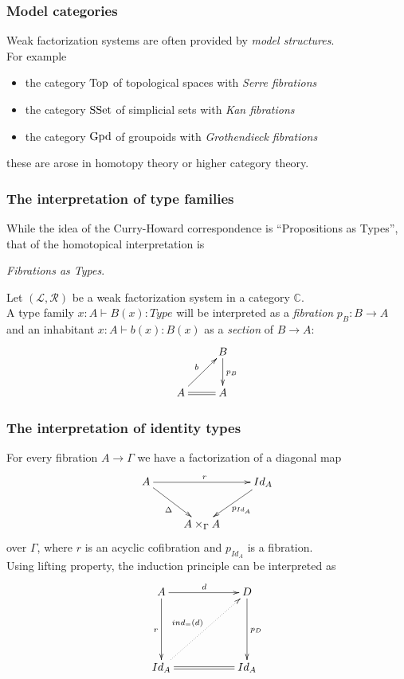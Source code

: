 \documentclass[dvipdfmx]{beamer}
\begin{document}
\begin{frame}
  \frametitle{Model categories}
  Weak factorization systems are often provided
  by {\it model structures}.
  \\
  For example
  \begin{itemize}
    \item the category ${\rm Top}$ of topological spaces
      with {\it Serre fibrations}
    \item the category ${\rm SSet}$ of simplicial sets
      with {\it Kan fibrations}
    \item the category ${\rm Gpd}$ of groupoids
      with {\it Grothendieck fibrations}
  \end{itemize}
  these are arose in homotopy theory or
  higher category theory.
\end{frame}

\begin{frame}
  \frametitle{The interpretation of type families}
  While the idea of the Curry-Howard correspondence is
  ``Propositions as Types'',
  that of the homotopical interpretation is
  \begin{center}
    {\it Fibrations as Types}.
  \end{center}
  Let $\left( {\mathcal L} , {\mathcal R} \right)$
  be a weak factorization system in a category ${\mathbb C}$.
  \\
  A type family $x : A \vdash B \left( x \right) : Type$
  will be interpreted as a {\it fibration} $p_{B} : B \to A$
  and an inhabitant
  $x : A \vdash b \left( x \right) : B \left( x \right)$
  as a {\it section} of
  $B \to A$:
  \[
    \xymatrix{
      & B \ar[d]^{p_{B}}
      \\
      A \ar@{=}[r] \ar[ur]^{b}
      & A
    }
  \]
\end{frame}

\begin{frame}
  \frametitle{The interpretation of identity types}
  For every fibration $A \to \Gamma$
  we have a factorization of a diagonal map
  \[
    \xymatrix{
      A \ar[rr]^{r} \ar[dr]_{\Delta}
      &
      & Id_{A} \ar[dl]^{p_{Id_A}}
      \\
      & A \times _{\Gamma}  A
      &
    }
  \]
  over $\Gamma$, where $r$ is an acyclic cofibration
  and $p_{Id_A}$ is a fibration.
  \\
  Using lifting property,
  the induction principle can be interpreted as
  \[
    \xymatrix{
      A \ar[rr]^{d} \ar[dd]_{r}
      &
      & D \ar[dd]^{p_{D}}
      \\
      & & \\
      Id_{A} \ar@{=}[rr] \ar@{.>}[urur]^{ind_{=} \left( d \right)}
      &
      & Id_{A}
    }
  \]
\end{frame}
\end{document}
